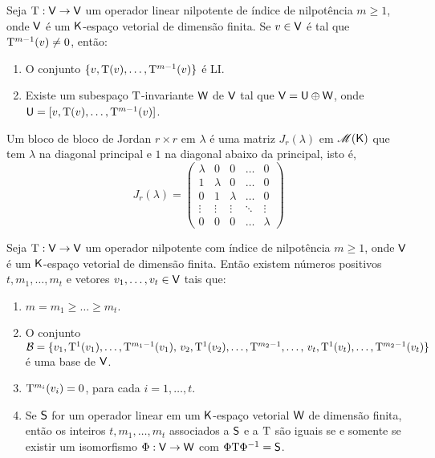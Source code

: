 \documentclass[10pt,a4paper]{book}
\begin{document}
\begin{proposition}
	Seja $\mathrm{ T } : \mathsf{ V } \rightarrow \mathsf{ V } $ um operador linear nilpotente de índice de nilpotência $m \geq 1$, onde $\mathsf{ V }$ é um $\mathsf{ K }$-espaço vetorial de dimensão finita. Se $v \in \mathsf{ V }$ é tal que $\mathrm{ T } ^ {m - 1}(v) \neq 0$, então:
	\begin{enumerate}
		\item O conjunto $\{ v, \mathrm{ T }(v), \dots, \mathrm{ T } ^ {m - 1}(v) \}$ é LI.
		\item Existe um subespaço $\mathrm{ T }$-invariante $\mathsf{ W }$ de $\mathsf{ V }$ tal que $\mathsf{ V } = \mathsf{ U } \oplus \mathsf{ W }$, onde $\mathsf{ U } = [ v, \mathrm{ T }(v), \dots, \mathrm{ T } ^ {m - 1}(v) ]$.
	\end{enumerate}
\end{proposition}

\begin{definition}
	Um bloco de bloco de Jordan $r \times r$ em $\lambda$ é uma matriz $J_r(\lambda)$ em $\mathscr{ M }(\mathsf{ K })$ que tem $\lambda$ na diagonal principal e $1$ na diagonal abaixo da principal, isto é,
	\[
		J_r(\lambda) = \left( 
			\begin{array}{ccccc}
				\lambda & 0       & 0       & \dots  &       0 \\
				1       & \lambda & 0       & \dots  &       0 \\
				0       & 1       & \lambda & \dots  &       0 \\
				\vdots  & \vdots  & \vdots  & \ddots &  \vdots \\
				0       & 0       & 0       & \dots  & \lambda
			\end{array}
		\right)
	\]
\end{definition}

\begin{theorem}
	Seja $\mathrm{ T } : \mathsf{ V } \rightarrow \mathsf{ V }$ um operador nilpotente com índice de nilpotência $m \geq 1$, onde $\mathsf{ V }$ é um $\mathsf{ K }$-espaço vetorial de dimensão finita. Então existem números positivos $t, m_1, \dots, m_t$ e vetores $v_1, \dots, v_t \in \mathsf{ V }$ tais que:
	\begin{enumerate}
		\item $m = m_1 \geq \dots \geq m_t$.
		\item O conjunto $\mathcal{ B } = \{ v_1, \mathrm{ T } ^ 1(v_1), \dots, \mathrm{ T } ^ {m_1-1}(v_1), \, v_2, \mathrm{ T } ^ 1(v_2), \dots, \mathrm{ T } ^ {m_2-1}, \dots,\, v_t, \mathrm{ T } ^ 1(v_t), \dots, \mathrm{ T } ^ {m_2-1}(v_t) \}$ é uma base de $\mathsf{ V }$.
		\item $\mathrm{ T } ^ {m_i}(v_i) = 0$, para cada $i = 1, \dots, t$.
		\item Se $\mathsf{ S }$ for um operador linear em um $\mathsf{ K }$-espaço vetorial $\mathsf{ W }$ de dimensão finita, então os inteiros $t, m_1, \dots, m_t$ associados a $\mathsf{ S }$ e a $\mathrm{ T }$ são iguais se e somente se existir um isomorfismo $\Phi: \mathsf{ V } \rightarrow \mathsf{ W }$ com $\Phi\mathrm{ T }\Phi ^ {-1} = \mathsf{ S }$.
	\end{enumerate}
\end{theorem}
\end{document}
